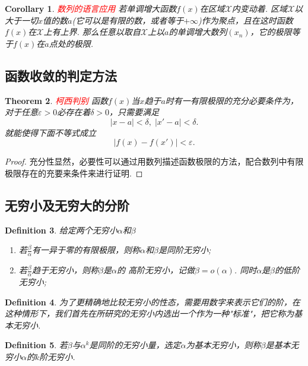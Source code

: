 \documentclass{article}
\newtheorem{theorem}{Theorem}[section]
\newtheorem{corollary}[theorem]{Corollary}
\newtheorem{definition}[theorem]{Definition}
\newcommand{\redt}[1]{\textcolor{red}{#1}}
\begin{document}
\begin{corollary}
\rm \redt{数列的语言应用} 若单调增大函数$f(x)$在区域$\mathcal{X}$内变动着. 区域$\mathcal{X}$以大于一切$x$值的数$a$(它可以是有限的数，或者等于$+\infty$)作为聚点，且在这时函数$f(x)$在$\mathcal{X}$上有上界. 那么任意以取自$\mathcal{X}$上以$a$的单调增大数列$(x_n)$，它的极限等于$f(x)$在$a$点处的极限. 
\end{corollary}


\subsection{函数收敛的判定方法}

\begin{theorem}
\rm \redt{柯西判别} 函数$f(x)$当$x$趋于$a$时有一有限极限的充分必要条件为，对于任意$\varepsilon > 0$必存在着$\delta > 0$，只需要满足
$$
|x-a| < \delta,\; |x'-a| < \delta.
$$
就能使得下面不等式成立
$$
|f(x)-f(x')| < \varepsilon.
$$
\end{theorem}

\begin{proof}
{\color{blue}充分性显然，必要性可以通过用数列描述函数极限的方法，配合数列中有限极限存在的充要来条件来进行证明}.
\end{proof}

\subsection{无穷小及无穷大的分阶}


\begin{definition}
\rm 给定两个无穷小$\alpha$和$\beta$
\begin{enumerate}
	\item 若$\frac{\beta}{\alpha}$有一异于零的有限极限，则称$\alpha$和$\beta$是{\color{red}同阶无穷小};
	\item 若$\frac{\beta}{\alpha}$趋于无穷小，则称$\beta$是$\alpha$的{\color{red} 高阶无穷小}，记做$\beta = o(\alpha)$.
	同时$\alpha$是$\beta$的低阶无穷小;
\end{enumerate}
\end{definition}

\begin{definition}
\rm 为了更精确地比较无穷小的性态，需要用数字来表示它们的阶，在这种情形下，我们首先在所研究的无穷小内选出一个作为一种"标准"，把它称为{\color{red}基本无穷小}.
\end{definition}

\begin{definition}
\rm 若$\beta$与$\alpha^k$是同阶的无穷小量，选定$\alpha$为基本无穷小，则称$\beta$是基本无穷小$\alpha$的$k$阶无穷小.
\end{definition}
\end{document}
